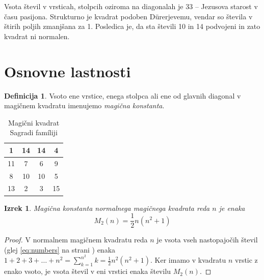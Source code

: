 \documentclass[a4paper,12pt]{article}
\theoremstyle{definition}
\newtheorem{definicija}{Definicija}
\theoremstyle{plain}
\newtheorem{izrek}{Izrek}
\begin{document}
Vsota števil v vrsticah, stolpcih oziroma na diagonalah je 33 -- Jezusova starost
v času pasijona. Strukturno je kvadrat podoben Dürerjevemu, vendar so števila
v štirih poljih zmanjšana za 1. Posledica je, da sta števili 10 in 14 podvojeni
in zato kvadrat ni normalen.
%


\section{Osnovne lastnosti}

\begin{definicija}
   Vsoto ene vrstice, enega stolpca ali ene od glavnih diagonal
   v magičnem kvadratu imenujemo \emph{magična konstanta}.
\end{definicija}
\newpage

\begin{table}[!ht]
   \centering
   \caption{Magični kvadrat Sagradi famíliji}
   \label{table:sagrada}
   \large
   \begin{tabular}{|c|c|c|c|}
      \hline
      1 & 14 & 14 &  4 \\\hline
      11 &  7 &  6 &  9 \\\hline
       8 & 10 & 10 &  5 \\\hline
      13 &  2 &  3 & 15 \\\hline
   \end{tabular}
\end{table}

\begin{izrek}
   Magična konstanta normalnega magičnega kvadrata reda \( n \)
   je enaka
   \begin{equation}
      \label{eq:mc}
      M_2(n) = \frac{1}{2} n(n^2+1)
   \end{equation}
\end{izrek}

\begin{proof}
   V normalnem magičnem kvadratu reda $n$ je vsota vseh nastopajočih
   števil (glej \eqref{eq:numbers} na strani \pageref{eq:numbers}) enaka
   $1+2+3+\dots+n^2=\sum_{k=1}^{n^2}k=\frac{1}{2}n^2(n^2+1)$. Ker imamo
   v kvadratu $n$ vrstic z enako vsoto, je vsota števil v eni vrstici
   enaka številu $M_2(n)$. %
\end{proof}
\end{document}
